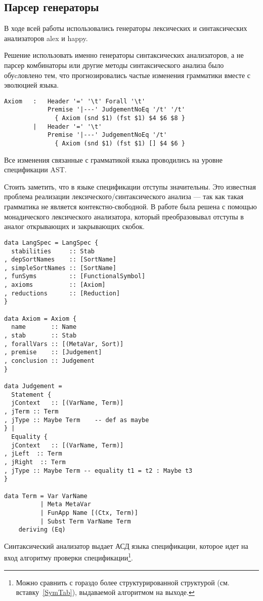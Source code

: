 \subsection{Парсер генераторы}
В ходе всей работы использовались генераторы лексических и синтаксических анализаторов alex\cite{alex} и happy\cite{happy}.

Решение использовать именно генераторы синтаксических анализаторов, а не парсер комбинаторы\cite{parsec} или другие методы синтаксического анализа было обуcловлено тем, что прогнозировались частые изменения грамматики вместе с эволюцией языка.


\begin{lstlisting}[caption={Часть спецификации синтаксического анализатора},captionpos=b, frame=single]
Axiom   :   Header '=' '\t' Forall '\t'
            Premise '|---' JudgementNoEq '/t' '/t'
              { Axiom (snd $1) (fst $1) $4 $6 $8 }
        |   Header '=' '\t'
            Premise '|---' JudgementNoEq '/t'
              { Axiom (snd $1) (fst $1) [] $4 $6 }
\end{lstlisting}


Все изменения связанные с грамматикой языка проводились на уровне спецификации AST.

\hfill

Стоить заметить, что в языке спецификации отступы значительны. Это известная проблема реализации лексического/синтаксического анализа --- так как такая грамматика не является контекстно-свободной. В работе была решена с помощью монадического лексического анализатора, который преобразовывал отступы в аналог открывающих и закрывающих скобок.

\begin{minipage}{\linewidth}
\begin{lstlisting}[caption={АСД языка спецификации},captionpos=b,frame=single]
data LangSpec = LangSpec {
  stabilities     :: Stab
, depSortNames    :: [SortName]
, simpleSortNames :: [SortName]
, funSyms         :: [FunctionalSymbol]
, axioms          :: [Axiom]
, reductions      :: [Reduction]
}

data Axiom = Axiom {
  name       :: Name
, stab       :: Stab
, forallVars :: [(MetaVar, Sort)]
, premise    :: [Judgement]
, conclusion :: Judgement
}

data Judgement =
  Statement {
  jContext   :: [(VarName, Term)]
, jTerm :: Term
, jType :: Maybe Term    -- def as maybe
} |
  Equality {
  jContext   :: [(VarName, Term)]
, jLeft  :: Term
, jRight  :: Term
, jType :: Maybe Term -- equality t1 = t2 : Maybe t3
}

data Term = Var VarName
          | Meta MetaVar
          | FunApp Name [(Ctx, Term)]
          | Subst Term VarName Term
    deriving (Eq)
\end{lstlisting}
\end{minipage}

Синтаксический анализатор выдает АСД языка спецификации, которое идет на вход алгоритму проверки спецификации\footnote{Можно сравнить с гораздо более структурированной структурой (см. вставку~\ref{SymTab}), выдаваемой алгоритмом на выходе.}.

